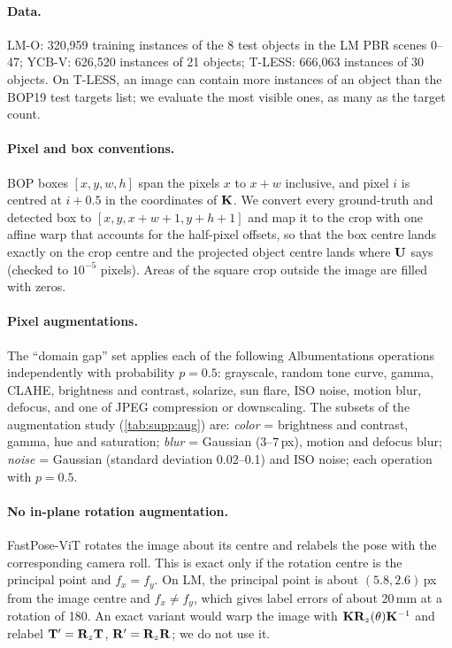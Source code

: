 \paragraph{Data.}
LM-O: 320,959 training instances of the 8 test objects in the LM PBR scenes 0--47; YCB-V: 626,520
instances of 21 objects; T-LESS: 666,063 instances of 30 objects. On T-LESS, an image can contain
more instances of an object than the BOP19 test targets list; we evaluate the most visible ones, as
many as the target count.

\paragraph{Pixel and box conventions.}
BOP boxes $[x, y, w, h]$ span the pixels $x$ to $x + w$ inclusive, and pixel $i$ is centred at
$i + 0.5$ in the coordinates of $\mathbf{K}$. We convert every ground-truth and detected box to
$[x, y, x + w + 1, y + h + 1]$ and map it to the crop with one affine warp that accounts for the
half-pixel offsets, so that the box centre lands exactly on the crop centre and the projected
object centre lands where $\mathbf{U}$ says (checked to $10^{-5}$ pixels). Areas of the square crop
outside the image are filled with zeros.

\paragraph{Pixel augmentations.}
The ``domain gap'' set applies each of the following Albumentations operations independently with
probability $p = 0.5$: grayscale, random tone curve, gamma, CLAHE, brightness and contrast,
solarize, sun flare, ISO noise, motion blur, defocus, and one of JPEG compression or downscaling.
The subsets of the augmentation study (\cref{tab:supp:aug}) are: \emph{color} = brightness and
contrast, gamma, hue and saturation; \emph{blur} = Gaussian ($3$--$7$\,px), motion and defocus
blur; \emph{noise} = Gaussian (standard deviation 0.02--0.1) and ISO noise; each operation with
$p = 0.5$.

\paragraph{No in-plane rotation augmentation.}
FastPose-ViT rotates the image about its centre and relabels the pose with the corresponding
camera roll. This is exact only if the rotation centre is the principal point and $f_x = f_y$.
On LM, the principal point is about $(5.8, 2.6)$\,px from the image centre and $f_x \neq f_y$,
which gives label errors of about 20\,mm at a rotation of 180\textdegree. An exact variant would
warp the image with $\mathbf{K} \mathbf{R}_z(\theta) \mathbf{K}^{-1}$ and relabel $\mathbf{T}' = \mathbf{R}_z \mathbf{T}$,
$\mathbf{R}' = \mathbf{R}_z \mathbf{R}$; we do not use it.

